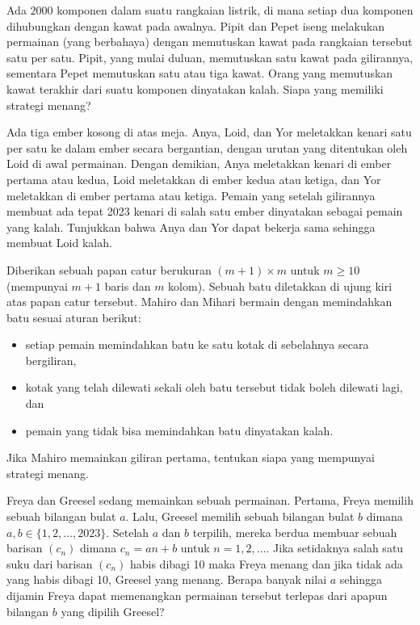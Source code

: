 \documentclass[11pt]{scrartcl}
\begin{document}
\begin{soaljawab}
Ada $2000$ komponen dalam suatu rangkaian listrik, di mana setiap dua komponen dihubungkan dengan kawat pada awalnya. Pipit dan Pepet iseng melakukan permainan (yang berbahaya) dengan memutuskan kawat pada rangkaian tersebut satu per satu. Pipit, yang mulai duluan, memutuskan satu kawat pada gilirannya, sementara Pepet memutuskan satu atau tiga kawat. Orang yang memutuskan kawat terakhir dari suatu komponen dinyatakan kalah. Siapa yang memiliki strategi menang?
\end{soaljawab}

\begin{soaljawab}
Ada tiga ember kosong di atas meja. Anya, Loid, dan Yor meletakkan kenari satu per satu ke dalam ember secara bergantian, dengan urutan yang ditentukan oleh Loid di awal permainan. Dengan demikian, Anya meletakkan kenari di ember pertama atau kedua, Loid meletakkan di ember kedua atau ketiga, dan Yor meletakkan di ember pertama atau ketiga. Pemain yang setelah gilirannya membuat ada tepat 2023 kenari di salah satu ember dinyatakan sebagai pemain yang kalah. Tunjukkan bahwa Anya dan Yor dapat bekerja sama sehingga membuat Loid kalah.
\end{soaljawab}

\begin{soaljawab}
    Diberikan sebuah papan catur berukuran $(m+1) \times m$ untuk $m \ge 10$ (mempunyai $m+1$ baris dan $m$ kolom). Sebuah batu diletakkan di ujung kiri atas papan catur tersebut. Mahiro dan Mihari bermain dengan memindahkan batu sesuai aturan berikut:
    \begin{itemize}
        \item setiap pemain memindahkan batu ke satu kotak di sebelahnya secara bergiliran,
        \item kotak yang telah dilewati sekali oleh batu tersebut tidak boleh dilewati lagi, dan
        \item pemain yang tidak bisa memindahkan batu dinyatakan kalah.
    \end{itemize}
    Jika Mahiro memainkan giliran pertama, tentukan siapa yang mempunyai strategi menang.
\end{soaljawab}

\begin{soaljawab}
    Freya dan Greesel sedang memainkan sebuah permainan. Pertama, Freya memilih sebuah bilangan bulat $a$. Lalu, Greesel memilih sebuah bilangan bulat $b$ dimana $a,b \in \{1,2,\dots,2023\}$. Setelah $a$ dan $b$ terpilih, mereka berdua membuar sebuah barisan $(c_n)$ dimana $c_n = an + b$ untuk $n = 1,2,\dots$. Jika setidaknya salah satu suku dari barisan $(c_n)$ habis dibagi 10 maka Freya menang dan jika tidak ada yang habis dibagi 10, Greesel yang menang. Berapa banyak nilai $a$ sehingga dijamin Freya dapat memenangkan permainan tersebut terlepas dari apapun bilangan $b$ yang dipilih Greesel?
\end{soaljawab}
\end{document}
